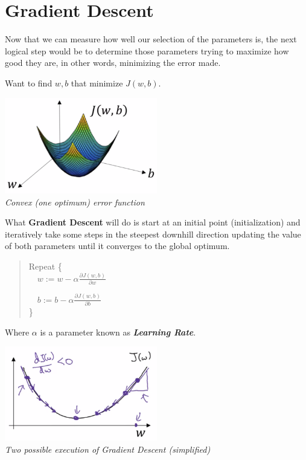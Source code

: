 \documentclass[
]{book}
\begin{document}
\hypertarget{gradient-descent}{%
\section{Gradient Descent}\label{gradient-descent}}

Now that we can measure how well our selection of the parameters is, the next logical step would be to determine those parameters trying to maximize how good they are, in other words, minimizing the error made.

Want to find \(w,b\) that minimize \(J(w,b)\).

\includegraphics[width=0.5\textwidth,height=\textheight]{images/convex.png}\\
\emph{Convex (one optimum) error function}

What \textbf{Gradient Descent} will do is start at an initial point (initialization) and iteratively take some steps in the steepest downhill direction updating the value of both parameters until it converges to the global optimum.

\begin{quote}
Repeat \{\\
 \(w := w - \alpha \frac{\partial J(w,b)}{\partial w}\)

 \(b := b - \alpha \frac{\partial J(w,b)}{\partial b}\)\\
\}
\end{quote}

Where \(\alpha\) is a parameter known as \textbf{\emph{Learning Rate}}.

\includegraphics[width=0.5\textwidth,height=\textheight]{images/exec_gradient.png}\\
\emph{Two possible execution of Gradient Descent (simplified)}
\end{document}
